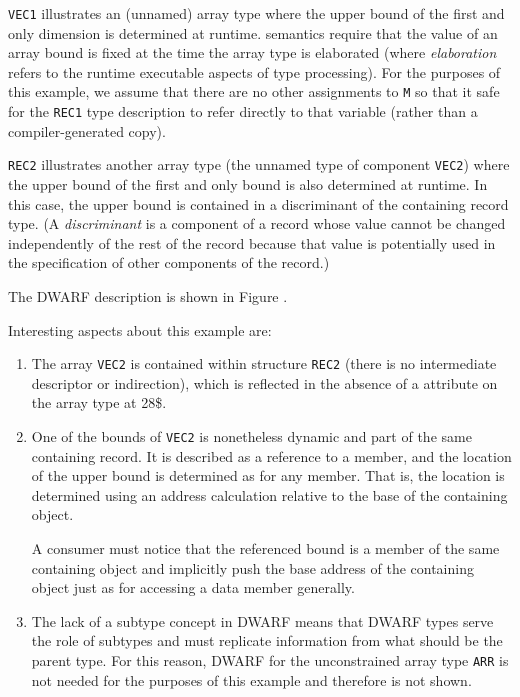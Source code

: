 \texttt{VEC1} illustrates an (unnamed) array type where the upper bound
of the first and only dimension is determined at runtime. 
semantics require that the value of an array bound is fixed at
the time the array type is elaborated (where \textit{elaboration} refers
to the runtime executable aspects of type processing). For
the purposes of this example, we assume that there are no
other assignments to \texttt{M} so that it safe for the \texttt{REC1} type
description to refer directly to that variable (rather than
a compiler-generated copy).

\texttt{REC2} illustrates another array type (the unnamed type of
component \texttt{VEC2}) where the upper bound of the first and only
bound is also determined at runtime. In this case, the upper
bound is contained in a discriminant of the containing record
type. (A \textit{discriminant} is a component of a record whose value
cannot be changed independently of the rest of the record
because that value is potentially used in the specification
of other components of the record.)

The DWARF description is shown in 
Figure .


Interesting aspects about this example are:
\begin{enumerate}[1. ]
\item The array \texttt{VEC2} is  contained within structure
\texttt{REC2} (there is no intermediate descriptor or indirection),
which is reflected in the absence of a 
attribute on the array type at 28\$.

\item One of the bounds of \texttt{VEC2} is nonetheless dynamic and part of
the same containing record. It is described as a reference to
a member, and the location of the upper bound is determined
as for any member. That is, the location is determined using
an address calculation relative to the base of the containing
object.  

A consumer must notice that the referenced bound is a
member of the same containing object and implicitly push the
base address of the containing object just as for accessing
a data member generally.

\item The lack of a subtype concept in DWARF means that DWARF types
serve the role of subtypes and must replicate information from
what should be the parent type. For this reason, DWARF for
the unconstrained array type \texttt{ARR} is not needed for the purposes
of this example and therefore is not shown.
\end{enumerate}


